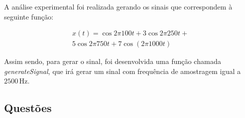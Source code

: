 A análise experimental foi realizada gerando os sinais que correspondem à seguinte função:

\begin{align}
    x(t) = \cos{2\pi 100 t} + 3 \cos{2\pi 250 t} + \\
    5 \cos{2\pi 750 t} + 7 \cos(2\pi 1000 t)    
\end{align}

Assim sendo, para gerar o sinal, foi desenvolvida uma função chamada \textit{generateSignal}, que irá gerar um sinal com frequência de amostragem igual a $2500\, \text{Hz}$.


\subsection{Questões}


